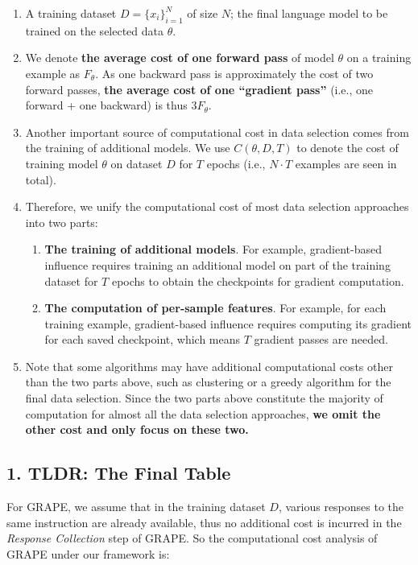 \begin{enumerate}
    \item A training dataset $D = \{ x_i \}_{i=1}^N$ of size $N$; the final language model to be trained on the selected data $\theta$.
    \item We denote \textbf{the average cost of one forward pass} of model $\theta$ on a training example as $F_{\theta}$. As one backward pass is approximately the cost of two forward passes, \textbf{the average cost of one ``gradient pass''} (i.e., one forward + one backward) is thus $3F_{\theta}$.
    \item Another important source of computational cost in data selection comes from the training of additional models. We use $C(\theta, D, T)$ to denote the cost of training model $\theta$ on dataset $D$ for $T$ epochs (i.e., $N \cdot T$ examples are seen in total).
    \item Therefore, we unify the computational cost of most data selection approaches into two parts:
    \begin{enumerate}
        \item \textbf{The training of additional models}. For example, gradient-based influence requires training an additional model on part of the training dataset for $T$ epochs to obtain the checkpoints for gradient computation.
        \item \textbf{The computation of per-sample features}. For example, for each training example, gradient-based influence requires computing its gradient for each saved checkpoint, which means $T$ gradient passes are needed.
    \end{enumerate}
    \item Note that some algorithms may have additional computational costs other than the two parts above, such as clustering or a greedy algorithm for the final data selection. Since the two parts above constitute the majority of computation for almost all the data selection approaches, \textbf{we omit the other cost and only focus on these two.}
\end{enumerate}

\subsection*{1. TLDR: The Final Table}

For GRAPE, we assume that in the training dataset $D$, various responses to the same instruction are already available, thus no additional cost is incurred in the \textit{Response Collection} step of GRAPE. So the computational cost analysis of GRAPE under our framework is:

